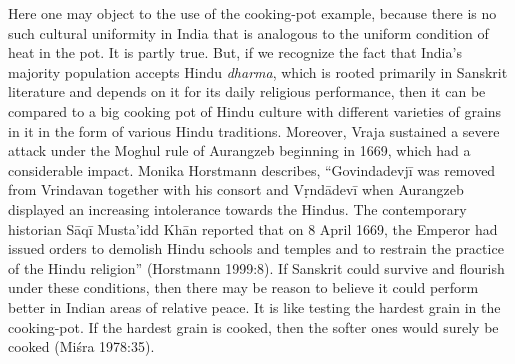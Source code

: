 Here one may object to the use of the cooking-pot example, because there is no such cultural uniformity in India that is analogous to the uniform condition of heat in the pot. It is partly true. But, if we recognize the fact that India’s majority population accepts Hindu {\sl dharma}, which is rooted primarily in Sanskrit literature and depends on it for its daily religious performance, then it can be compared to a big cooking pot of Hindu culture with different varieties of grains in it in the form of various Hindu traditions. Moreover, Vraja  sustained a severe attack under the Moghul rule of Aurangzeb beginning in 1669, which had a considerable impact. Monika Horstmann describes, “Govindadevjī was removed from Vrindavan together with his consort and Vṛndādevī when Aurangzeb displayed an increasing intolerance towards the Hindus. The contemporary historian Sāqī Musta’idd Khān reported that on 8 April 1669, the Emperor had issued orders to demolish Hindu schools and temples and to restrain the practice of the Hindu religion” (Horstmann 1999:8). If Sanskrit could survive and flourish under these conditions, then there may be reason to believe it could perform better in Indian areas of relative peace. It is like testing the hardest grain in the cooking-pot. If the hardest grain is cooked, then the softer ones would surely be cooked (Miśra 1978:35). 

